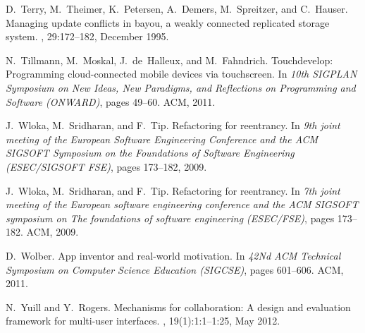 \documentclass[article]{sigplanconf}
\begin{document}
\begin{thebibliography}{10}
D.~Terry, M.~Theimer, K.~Petersen, A.~Demers, M.~Spreitzer, and C.~Hauser.
\newblock Managing update conflicts in bayou, a weakly connected replicated
  storage system.
, 29:172--182, December 1995.

N.~Tillmann, M.~Moskal, J.~de~Halleux, and M.~Fahndrich.
\newblock Touchdevelop: Programming cloud-connected mobile devices via
  touchscreen.
\newblock In {\em 10th SIGPLAN Symposium on New Ideas, New Paradigms, and
  Reflections on Programming and Software (ONWARD)}, pages 49--60. ACM, 2011.

J.~Wloka, M.~Sridharan, and F.~Tip.
\newblock Refactoring for reentrancy.
\newblock In {\em 9th joint meeting of the European Software Engineering
  Conference and the ACM SIGSOFT Symposium on the Foundations of Software
  Engineering (ESEC/SIGSOFT FSE)}, pages 173--182, 2009.

J.~Wloka, M.~Sridharan, and F.~Tip.
\newblock Refactoring for reentrancy.
\newblock In {\em 7th joint meeting of the European software engineering
  conference and the ACM SIGSOFT symposium on The foundations of software
  engineering (ESEC/FSE)}, pages 173--182. ACM, 2009.

D.~Wolber.
\newblock App inventor and real-world motivation.
\newblock In {\em 42Nd ACM Technical Symposium on Computer Science Education
  (SIGCSE)}, pages 601--606. ACM, 2011.

N.~Yuill and Y.~Rogers.
\newblock Mechanisms for collaboration: A design and evaluation framework for
  multi-user interfaces.
, 19(1):1:1--1:25, May 2012.

\end{thebibliography}
\end{document}
